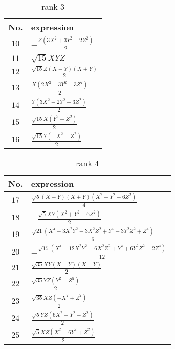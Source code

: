 \documentclass[fleqn,8pt,landscape]{jsarticle}
\begin{document}
\begin{table}[ht!]
\begin{center}
\caption{rank 3}
\renewcommand{\arraystretch}{1.3}
\begin{tabular}{cl} \hline \hline
No. & expression \\ \hline
$ 10 $ & $ - \frac{Z \left(3 X^{2} + 3 Y^{2} - 2 Z^{2}\right)}{2} $ \\
$ 11 $ & $ \sqrt{15} X Y Z $ \\
$ 12 $ & $ \frac{\sqrt{15} Z \left(X - Y\right) \left(X + Y\right)}{2} $ \\
$ 13 $ & $ \frac{X \left(2 X^{2} - 3 Y^{2} - 3 Z^{2}\right)}{2} $ \\
$ 14 $ & $ \frac{Y \left(3 X^{2} - 2 Y^{2} + 3 Z^{2}\right)}{2} $ \\
$ 15 $ & $ \frac{\sqrt{15} X \left(Y^{2} - Z^{2}\right)}{2} $ \\
$ 16 $ & $ \frac{\sqrt{15} Y \left(- X^{2} + Z^{2}\right)}{2} $ \\
 \hline \hline
\end{tabular}
\end{center}
\end{table}
\begin{table}[ht!]
\begin{center}
\caption{rank 4}
\renewcommand{\arraystretch}{1.3}
\begin{tabular}{cl} \hline \hline
No. & expression \\ \hline
$ 17 $ & $ \frac{\sqrt{5} \left(X - Y\right) \left(X + Y\right) \left(X^{2} + Y^{2} - 6 Z^{2}\right)}{4} $ \\
$ 18 $ & $ - \frac{\sqrt{5} X Y \left(X^{2} + Y^{2} - 6 Z^{2}\right)}{2} $ \\
$ 19 $ & $ \frac{\sqrt{21} \left(X^{4} - 3 X^{2} Y^{2} - 3 X^{2} Z^{2} + Y^{4} - 3 Y^{2} Z^{2} + Z^{4}\right)}{6} $ \\
$ 20 $ & $ - \frac{\sqrt{15} \left(X^{4} - 12 X^{2} Y^{2} + 6 X^{2} Z^{2} + Y^{4} + 6 Y^{2} Z^{2} - 2 Z^{4}\right)}{12} $ \\
$ 21 $ & $ \frac{\sqrt{35} X Y \left(X - Y\right) \left(X + Y\right)}{2} $ \\
$ 22 $ & $ \frac{\sqrt{35} Y Z \left(Y^{2} - Z^{2}\right)}{2} $ \\
$ 23 $ & $ \frac{\sqrt{35} X Z \left(- X^{2} + Z^{2}\right)}{2} $ \\
$ 24 $ & $ \frac{\sqrt{5} Y Z \left(6 X^{2} - Y^{2} - Z^{2}\right)}{2} $ \\
$ 25 $ & $ \frac{\sqrt{5} X Z \left(X^{2} - 6 Y^{2} + Z^{2}\right)}{2} $ \\
 \hline \hline
\end{tabular}
\end{center}
\end{table}
\end{document}
